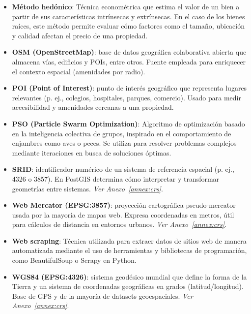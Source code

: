 \begin{itemize}
    \item \textbf{Método hedónico}: Técnica econométrica que estima el valor de un bien a partir de sus características intrínsecas y extrínsecas. En el caso de los bienes raíces, este método permite evaluar cómo factores como el tamaño, ubicación y calidad afectan el precio de una propiedad.

    \item \textbf{OSM (OpenStreetMap)}: base de datos geográfica colaborativa abierta que almacena vías, edificios y POIs, entre otros. Fuente empleada para enriquecer el contexto espacial (amenidades por radio). \cite{osm_poi}

    \item \textbf{POI (Point of Interest)}: punto de interés geográfico que representa lugares relevantes (p. ej., colegios, hospitales, parques, comercio). Usado para medir accesibilidad y amenidades cercanas a una propiedad. \cite{osm_poi}

    \item \textbf{PSO (Particle Swarm Optimization)}: Algoritmo de optimización basado en la inteligencia colectiva de grupos, inspirado en el comportamiento de enjambres como aves o peces. Se utiliza para resolver problemas complejos mediante iteraciones en busca de soluciones óptimas.

    \item \textbf{SRID}: identificador numérico de un sistema de referencia espacial (p. ej., 4326 o 3857). En PostGIS determina cómo interpretar y transformar geometrías entre sistemas. \emph{Ver Anexo~\ref{annex:crs}}. \cite{postgis_manual}

    \item \textbf{Web Mercator (EPSG:3857)}: proyección cartográfica pseudo-mercator usada por la mayoría de mapas web. Expresa coordenadas en metros, útil para cálculos de distancia en entornos urbanos. \emph{Ver Anexo~\ref{annex:crs}}. \cite{epsg3857}

    \item \textbf{Web scraping}: Técnica utilizada para extraer datos de sitios web de manera automatizada mediante el uso de herramientas y bibliotecas de programación, como BeautifulSoup o Scrapy en Python.

    \item \textbf{WGS84 (EPSG:4326)}: sistema geodésico mundial que define la forma de la Tierra y un sistema de coordenadas geográficas en grados (latitud/longitud). Base de GPS y de la mayoría de datasets geoespaciales. \emph{Ver Anexo~\ref{annex:crs}}. \cite{epsg4326}
\end{itemize}